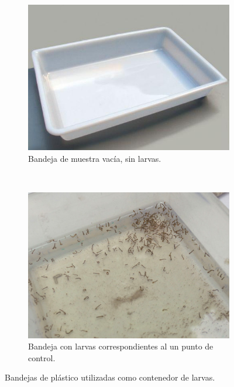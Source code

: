 \begin{figure}[!htbp]
    \centering
    \begin{subfigure}[b]{0.4\textwidth}
            \includegraphics[width=\textwidth]{capitulo-5/graphics/bandeja-muestra.jpg}
            \caption{Bandeja de muestra vacía, sin larvas.}
    \end{subfigure}
    ~~~~
    \begin{subfigure}[b]{0.4\textwidth}
            \includegraphics[width=\textwidth]{capitulo-5/graphics/larvas-dengue.jpg}
            \caption{Bandeja con larvas correspondientes al un punto de control.}

    \end{subfigure}
    \caption{\label{fig:cap5-conteo-pdi-bandejas} Bandejas de plástico utilizadas como contenedor
    de larvas.}
\end{figure}


